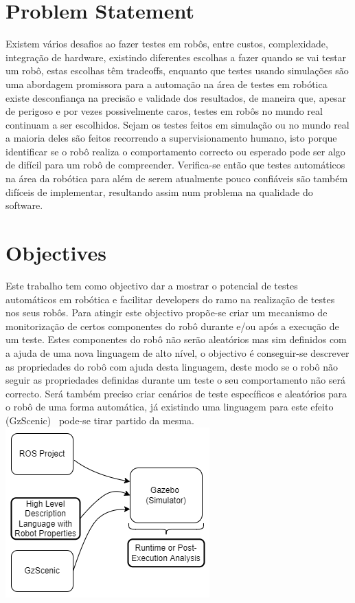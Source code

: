 \section{Problem Statement}
\label{sec:problem}
Existem vários desafios ao fazer testes em robôs, entre custos, complexidade, integração de hardware, 
existindo diferentes escolhas a fazer quando se vai testar um robô, estas escolhas têm tradeoffs, 
enquanto que testes usando simulações são uma abordagem promissora para a automação na área de testes 
em robótica existe desconfiança na precisão e validade dos resultados, de maneira que, apesar de 
perigoso e por vezes possivelmente caros, testes em robôs no mundo real continuam a ser escolhidos. 
Sejam os testes feitos em simulação ou no mundo real a maioria deles são feitos recorrendo a 
supervisionamento humano, isto porque identificar se o robô realiza o comportamento correcto ou 
esperado pode ser algo de difícil para um robô de compreender. Verifica-se então que testes automáticos 
na área da robótica para além de serem atualmente pouco confiáveis são também difíceis de implementar, 
resultando assim num problema na qualidade do software.~\cite{TestRob}

\section{Objectives}
\label{sec:objectives}
Este trabalho tem como objectivo dar a mostrar o potencial de testes automáticos em robótica e facilitar 
developers do ramo na realização de testes nos seus robôs. Para atingir este objectivo propõe-se criar 
um mecanismo de monitorização de certos componentes do robô durante e/ou após a execução de um teste. 
Estes componentes do robô não serão aleatórios mas sim definidos com a ajuda de uma nova linguagem de 
alto nível, o objectivo é conseguir-se descrever as propriedades do robô com ajuda desta linguagem, 
deste modo se o robô não seguir as propriedades definidas durante um teste o seu comportamento não será 
correcto. Será também preciso criar cenários de teste específicos e aleatórios para o robô de uma forma 
automática, já existindo uma linguagem para este efeito (GzScenic)~\cite{GzScenic} pode-se tirar partido 
da mesma.
\includegraphics{images/intro_diag.png}

